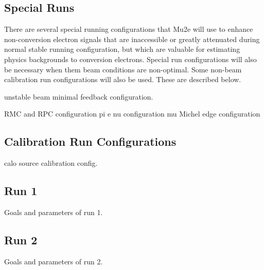 \subsection{Special Runs}
There are several special running configurations that Mu2e will use to enhance non-conversion electron signals that are inaccessible or greatly attenuated during normal stable running configuration, but which are valuable for estimating physics backgrounds to conversion electrons.  Special run configurations will also be necessary when them beam conditions are non-optimal.  Some non-beam calibration run configurations will also be used.  These are described below.

unstable beam minimal feedback configuration.

RMC and RPC configuration
pi e nu configuration
mu Michel edge configuration

\subsection{Calibration Run Configurations}
calo source calibration config.

\subsection{Run 1}
Goals and parameters of run 1.
\subsection{Run 2}
Goals and parameters of run 2.
